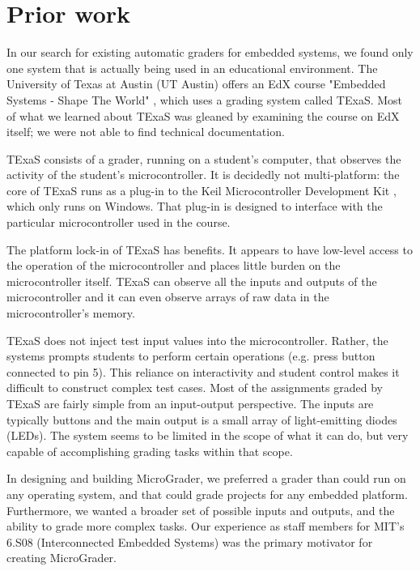 \documentclass[12pt]{article}
\begin{document}
\clearpage
\section{Prior work}
In our search for existing automatic graders for embedded systems, we found only one system that is actually being used in an educational environment.  The University of Texas at Austin (UT Austin) offers an EdX course "Embedded Systems - Shape The World" \cite{ut-austin-edx}, which uses a grading system called TExaS.  Most of what we learned about TExaS was gleaned by examining the course on EdX itself; we were not able to find technical documentation.

TExaS consists of a grader, running on a student's computer, that observes the activity of the student's microcontroller.  It is decidedly not multi-platform: the core of TExaS runs as a plug-in to the Keil Microcontroller Development Kit \cite{keil}, which only runs on Windows.  That plug-in is designed to interface with the particular microcontroller used in the course.

The platform lock-in of TExaS has benefits.  It appears to have low-level access to the operation of the microcontroller and places little burden on the microcontroller itself.  TExaS can observe all the inputs and outputs of the microcontroller and it can even observe arrays of raw data in the microcontroller's memory.

TExaS does not inject test input values into the microcontroller.  Rather, the systems prompts students to perform certain operations (e.g. press button connected to pin 5).  This reliance on interactivity and student control makes it difficult to construct complex test cases.  Most of the assignments graded by TExaS are fairly simple from an input-output perspective.  The inputs are typically buttons and the main output is a small array of light-emitting diodes (LEDs).  The system seems to be limited in the scope of what it can do, but very capable of accomplishing grading tasks within that scope.

In designing and building MicroGrader, we preferred a grader than could run on any operating system, and that could grade projects for any embedded platform.  Furthermore, we wanted a broader set of possible inputs and outputs, and the ability to grade more complex tasks.  Our experience as staff members for MIT's 6.S08 (Interconnected Embedded Systems) was the primary motivator for creating MicroGrader.
\end{document}

